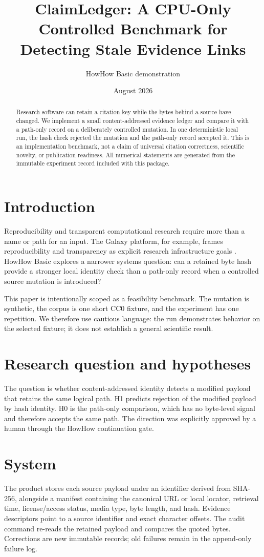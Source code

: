 \documentclass[11pt]{article}
\title{ClaimLedger: A CPU-Only Controlled Benchmark for Detecting Stale Evidence Links}
\author{HowHow Basic demonstration}
\date{August 2026}
\begin{document}
\maketitle
\begin{abstract}
Research software can retain a citation key while the bytes behind a source have changed. We implement a small content-addressed evidence ledger and compare it with a path-only record on a deliberately controlled mutation. In one deterministic local run, the hash check rejected the mutation and the path-only record accepted it. This is an implementation benchmark, not a claim of universal citation correctness, scientific novelty, or publication readiness. All numerical statements are generated from the immutable experiment record included with this package.
\end{abstract}

\section{Introduction}
Reproducibility and transparent computational research require more than a name or path for an input. The Galaxy platform, for example, frames reproducibility and transparency as explicit research infrastructure goals \cite{blazejewski2010}. HowHow Basic explores a narrower systems question: can a retained byte hash provide a stronger local identity check than a path-only record when a controlled source mutation is introduced?

This paper is intentionally scoped as a feasibility benchmark. The mutation is synthetic, the corpus is one short CC0 fixture, and the experiment has one repetition. We therefore use cautious language: the run demonstrates behavior on the selected fixture; it does not establish a general scientific result.

\section{Research question and hypotheses}
The question is whether content-addressed identity detects a modified payload that retains the same logical path. H1 predicts rejection of the modified payload by hash identity. H0 is the path-only comparison, which has no byte-level signal and therefore accepts the same path. The direction was explicitly approved by a human through the HowHow continuation gate.

\section{System}
The product stores each source payload under an identifier derived from SHA-256, alongside a manifest containing the canonical URL or local locator, retrieval time, license/access status, media type, byte length, and hash. Evidence descriptors point to a source identifier and exact character offsets. The audit command re-reads the retained payload and compares the quoted bytes. Corrections are new immutable records; old failures remain in the append-only failure log.
\end{document}
